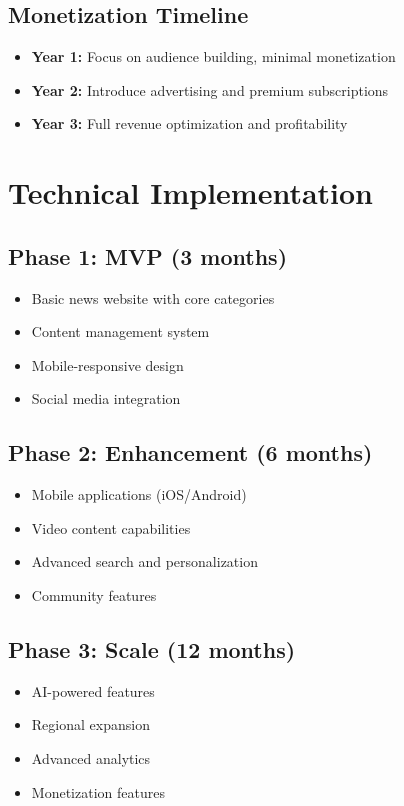 \documentclass[11pt,a4paper]{article}
\begin{document}
\subsection{Monetization Timeline}
\begin{itemize}[leftmargin=2em]
    \item \textbf{Year 1:} Focus on audience building, minimal monetization
    \item \textbf{Year 2:} Introduce advertising and premium subscriptions
    \item \textbf{Year 3:} Full revenue optimization and profitability
\end{itemize}

\section{Technical Implementation}

\subsection{Phase 1: MVP (3 months)}
\begin{itemize}[leftmargin=2em]
    \item Basic news website with core categories
    \item Content management system
    \item Mobile-responsive design
    \item Social media integration
\end{itemize}

\subsection{Phase 2: Enhancement (6 months)}
\begin{itemize}[leftmargin=2em]
    \item Mobile applications (iOS/Android)
    \item Video content capabilities
    \item Advanced search and personalization
    \item Community features
\end{itemize}

\subsection{Phase 3: Scale (12 months)}
\begin{itemize}[leftmargin=2em]
    \item AI-powered features
    \item Regional expansion
    \item Advanced analytics
    \item Monetization features
\end{itemize}
\end{document}

